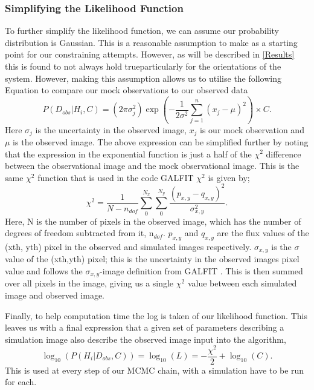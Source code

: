 \subsubsection{Simplifying the Likelihood Function}
To further simplify the likelihood function, we can assume our probability distribution is Gaussian. This is a reasonable assumption to make as a starting point for our constraining attempts. However, as will be described in \DIFdelbegin {}\DIFdelend \DIFaddbegin {}\DIFaddend \ref{Results} this is found to not always hold true\DIFdelbegin \DIFdel{; }\DIFdelend \DIFaddbegin \DIFadd{, }\DIFaddend particularly for the orientations of the system. However, making this assumption allows us to utilise the following Equation to compare our mock observations to our observed data\DIFdelbegin \DIFdel{;
}\DIFdelend \DIFaddbegin \DIFadd{:
}\DIFaddend \begin{equation}\label{like_gauss}
P(D_{obs}|H_{i},C) = (2\pi\sigma^{2}_{j})\exp(-\frac{1}{2\sigma^{2}}\sum_{j=1}^{n}(x_{j}-\mu)^{2}) \times C.
\end{equation}
Here $\sigma_{j}$ is the uncertainty in the observed image, $x_{j}$ is our mock observation and $\mu$ is the observed image. The above expression can be simplified further by noting that the expression in the exponential function is just a half of the $\chi^{2}$ difference between the observational image and the mock observational image. This is the same $\chi^{2}$ function that is used in the code GALFIT \citep{2002AJ....124..266P}\DIFdelbegin {}\DIFdelend \DIFaddbegin {}\DIFaddend $\chi^{2}$ is given by;
\begin{equation}\label{chi_squared}
\chi^{2} = \frac{1}{N - n_{dof}}\sum_{0}^{N_{x}}\sum_{0}^{N_{y}}\frac{(p_{x,y} - q_{x,y})^{2}}{\sigma_{x,y}^{2}}.
\end{equation}
Here, N is the number of pixels in the observed image, which has the number of degrees of freedom subtracted from it, n$_{dof}$. $p_{x,y}$ and $q_{x,y}$ are the flux values of the (xth, yth) pixel in the observed and simulated images respectively. $\sigma_{x,y}$ is the $\sigma$ value of the (xth,yth) pixel; this is the uncertainty in the observed images pixel value and follows the $\sigma_{x,y}$-image definition from GALFIT \citep{2002AJ....124..266P,2010AJ....139.2097P}. This is then summed over all pixels in the image, giving us a single $\chi^{2}$ value between each simulated image and observed image.

Finally, to help computation time the log is taken of our likelihood function. This leaves us with a final expression that a given set of parameters describing a simulation image also describe the observed image input into the algorithm,
\begin{equation}\label{likelihood}
\log_{10}(P(H_{i}|D_{obs},C)) = \log_{10}(L) = - \frac{\chi^{2}}{2} + \log_{10}(C).
\end{equation}
This is used at every step of our MCMC chain, with a simulation have to be run for each.

